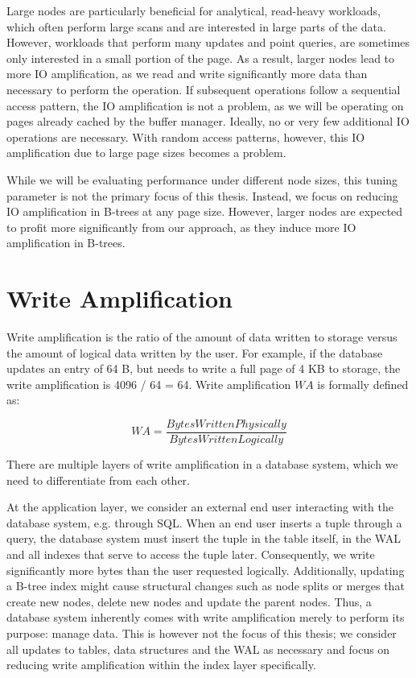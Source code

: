 Large nodes are particularly beneficial for analytical, read-heavy workloads, which often perform large scans and are interested in large parts of the data.
However, workloads that perform many updates and point queries, are sometimes only interested in a small portion of the page.
As a result, larger nodes lead to more \ac{IO} amplification, as we read and write significantly more data than necessary to perform the operation.
If subsequent operations follow a sequential access pattern, the \ac{IO} amplification is not a problem, as we will be operating on pages already cached by the buffer manager.
Ideally, no or very few additional \ac{IO} operations are necessary.
With random access patterns, however, this \ac{IO} amplification due to large page sizes becomes a problem.

While we will be evaluating performance under different node sizes, this tuning parameter is not the primary focus of this thesis.
Instead, we focus on reducing \ac{IO} amplification in B-trees at any page size.
However, larger nodes are expected to profit more significantly from our approach, as they induce more \ac{IO} amplification in B-trees.


\section{Write Amplification}
Write amplification is the ratio of the amount of data written to storage versus the amount of logical data written by the user.
For example, if the database updates an entry of 64 B, but needs to write a full page of 4 KB to storage, the write amplification is 4096 / 64 = 64.
Write amplification $WA$ is formally defined as:

\[
WA = \frac{Bytes Written Physically}{Bytes Written Logically}
\]

There are multiple layers of write amplification in a database system, which we need to differentiate from each other.

At the application layer, we consider an external end user interacting with the database system, e.g. through SQL.
When an end user inserts a tuple through a query, the database system must insert the tuple in the table itself, in the \ac{WAL} and all indexes that serve to access the tuple later.
Consequently, we write significantly more bytes than the user requested logically.
Additionally, updating a B-tree index might cause structural changes such as node splits or merges that create new nodes, delete new nodes and update the parent nodes.
Thus, a database system inherently comes with write amplification merely to perform its purpose: manage data.
This is however not the focus of this thesis; we consider all updates to tables, data structures and the \ac{WAL} as necessary and focus on reducing write amplification within the index layer specifically.

